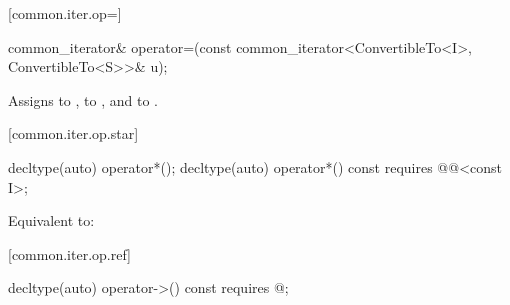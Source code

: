 [common.iter.op=]{}

%
%
\begin{itemdecl}
common_iterator& operator=(const common_iterator<ConvertibleTo<I>, ConvertibleTo<S>>& u);
\end{itemdecl}

\begin{itemdescr}
\pnum
\effects Assigns  to ,  to
, and  to .

\pnum
\returns {}
\end{itemdescr}

[common.iter.op.star]{}

%
%
\begin{itemdecl}
decltype(auto) operator*();
decltype(auto) operator*() const
  requires @@<const I>;
\end{itemdecl}

\begin{itemdescr}
\pnum
\requires {}

\pnum
\effects Equivalent to: 
\end{itemdescr}

[common.iter.op.ref]{}

%
%
\begin{itemdecl}
decltype(auto) operator->() const
  requires @\seebelow@;
\end{itemdecl}

